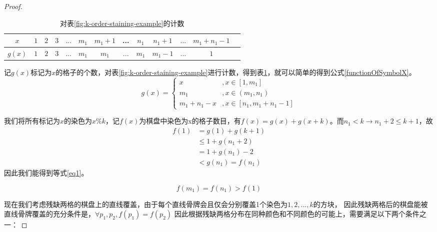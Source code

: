 \begin{proof}
    \begin{table}[htbp]
        \centering
        \caption{对表\ref{fig:k-order-staining-example}的计数}
        \begin{tabular}{|c|c|c|c|c|c|c|c|c|c|c|c|c|}
            \hline
            $x$    & $1$ & $2$ & $3$ & $...$ & $m_1$ & $m_1 + 1$ & ... & $n_1$ & $n_1 + 1$ & $...$ & $m_1 + n_1 - 1$ \\
            \hline
            $g(x)$ & $1$ & $2$ & $3$ & $...$ & $m_1$ & $m_1$     & ... & $m_1$ & $m_1 - 1$ & $...$ & $1$             \\
            \hline
        \end{tabular}
        \label{count}
    \end{table}
    记$g(x)$标记为$x$的格子的个数，对表\ref{fig:k-order-staining-example}进行计数，得到表\ref{count}，就可以简单的得到公式\ref{functionOfSymbolX}。
    \begin{equation}
        g(x)=\left\{
        \begin{aligned}
            x              & , x \in [1, m_1]             \\
            m_1            & , x \in (m_1, n_1)           \\
            m_1 + n_1  - x & , x \in [n_1, m_1 + n_1 - 1]
        \end{aligned}
        \right.
        \label{functionOfSymbolX}
    \end{equation}

    我们将所有标记为$x$的染色为$x \% k$，记$f(x)$为棋盘中染色为x的格子数目，有$f(x) = g(x) + g(x + k)$。而$n_1 < k \rightarrow n_1 + 2 \le k + 1$，故
    $$
        \begin{aligned}
            f(1) & = g(1) + g(k + 1)  \\
                 & \le 1 + g(n_1 + 2) \\
                 & = 1 + g(n_1) - 2   \\
                 & < g(n_1) = f(n_1)
        \end{aligned}
    $$
    因此我们能得到等式\ref{eq1}。

    \begin{equation}
        \label{eq1}
        f(m_1) = f(n_1) > f(1)
    \end{equation}

    现在我们考虑残缺两格的棋盘上的直线覆盖，由于每个直线骨牌会且仅会分别覆盖1个染色为$1, 2, ... ,k$的方块，
    因此残缺两格后的棋盘能被直线骨牌覆盖的充分条件是，$\forall p_1, p_2, f(p_1) = f(p_2)$
    因此根据残缺两格分布在同种颜色和不同颜色的可能上，需要满足以下两个条件之一：


\end{proof}
